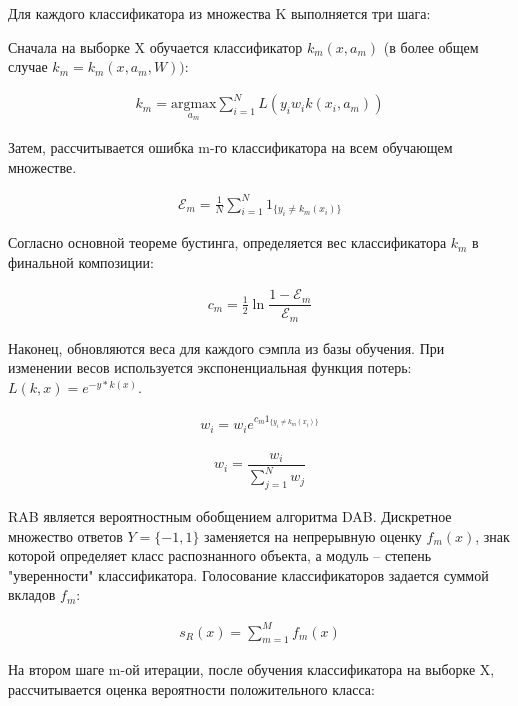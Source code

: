 Для каждого классификатора из множества K выполняется три шага:
\begin{enumerate}
{\item Сначала на выборке X обучается классификатор $k_m(x, a_m)$ (в более общем случае $k_m = k_m (x, a_m , W))$:

\begin{gather}
k_m=\underset{a_m} {\mathrm{argmax}}\sum\limits_{i=1}^{N}L(y_i w_i k(x_i, a_m))
\end{gather}

}
{\item Затем, рассчитывается ошибка m-го классификатора на всем обучающем множестве.

\begin{gather}
\mathcal{E}_m= \frac{1}{N} \sum\limits_{i=1}^{N} 1_{\{ y_i \neq k_m(x_i) \}}
\end{gather}

Согласно основной теореме бустинга, определяется вес классификатора $k_m$ в финальной композиции:

\begin{gather}
c_m = \frac{1}{2} \ln \dfrac{1-\mathcal{E}_m}{\mathcal{E}_m}
\end{gather}

}
{\item Наконец, обновляются веса для каждого сэмпла из базы обучения. При изменении весов используется экспоненциальная функция потерь: $L(k, x) = e^{-y \ast k(x)}$.

\begin{gather}
w_i = w_i e ^{c_m 1_{\{y_i \neq k_m(x_i)\}}}
\end{gather}

\begin{gather}
w_i = \dfrac{w_i}{\sum_{j=1}^{N}w_j}
\end{gather}

}
\end{enumerate}

RAB является вероятностным обобщением алгоритма DAB. Дискретное множество ответов $Y = \{−1, 1\}$ заменяется на непрерывную оценку $f_m(x)$, знак которой определяет класс распознанного объекта, а модуль -- степень "уверенности" классификатора. Голосование классификаторов задается суммой вкладов $f_m$:

\begin{gather}
s_R(x) = \sum\limits_{m=1}^{M} f_m(x)
\end{gather}

На втором шаге m-ой итерации, после обучения классификатора на выборке X, рассчитывается оценка вероятности положительного класса:

